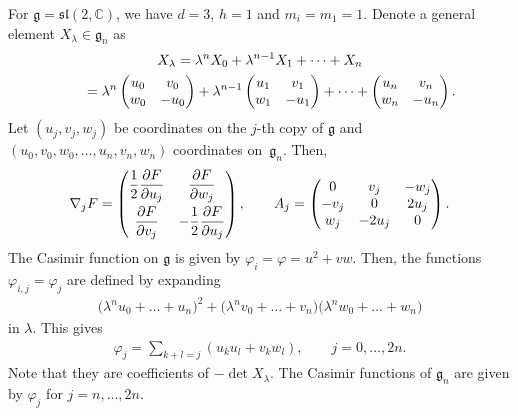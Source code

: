 \documentclass[pdftex]{sigma}
\numberwithin{equation}{section}
\begin{document}
\begin{Example}\label{example2.2}
For $\mathfrak{g} = \mathfrak{sl} (2, \mathbb{C})$, we have $d=3$, $h=1$ and $m_i = m_1 = 1$. Denote a general element $X_\lambda \in \mathfrak{g}_n$ as
\begin{gather*}
X_\lambda = \lambda ^nX_0 + \lambda ^{n-1} X_1 + \dots +X_n \\
\hphantom{X_\lambda}{} = \lambda ^n \left(
\begin{matrix}
u_0 & v_0 \\
w_0 & -u_0
\end{matrix}
\right) + \lambda ^{n-1}\left(
\begin{matrix}
u_1 & v_1 \\
w_1 & -u_1
\end{matrix}
\right) + \dots + \left(
\begin{matrix}
u_n & v_n \\
w_n & -u_n
\end{matrix}
\right).
\end{gather*}
Let $(u_j, v_j, w_j)$ be coordinates on the $j$-th copy of $\mathfrak{g}$ and $(u_0,v_0,w_0, \dots ,u_n,v_n,w_n)$ coordinates on~$\mathfrak{g}_n$. Then,
\begin{gather*}
\nabla _j F = \left(
\begin{matrix}
\displaystyle \frac{1}{2}\frac{\partial F}{\partial u_j} & \displaystyle \frac{\partial F}{\partial w_j} \vspace{1mm}\\
\displaystyle \frac{\partial F}{\partial v_j} & \displaystyle -\frac{1}{2}\frac{\partial F}{\partial u_j}
\end{matrix}
\right), \qquad A_j = \left(
\begin{matrix}
0 & v_j & -w_j \\
-v_j & 0 & 2u_j \\
w_j & -2u_j & 0
\end{matrix}
\right).
\end{gather*}
The Casimir function on $\mathfrak{g}$ is given by $\varphi _i = \varphi = u^2 + vw$. Then, the functions $\varphi _{i,j} = \varphi _j$ are def\/ined by expanding
\begin{gather*}
\big(\lambda ^n u_0 + \dots + u_n\big)^2 + \big(\lambda ^n v_0 + \dots + v_n\big)\big(\lambda ^n w_0 + \dots + w_n\big)
\end{gather*}
in $\lambda $. This gives
\begin{gather*}
\varphi _j = \sum_{k+l = j} \left( u_ku_l + v_k w_l \right), \qquad j=0,\dots ,2n.
\end{gather*}
Note that they are coef\/f\/icients of $-\det X_\lambda $. The Casimir functions of $\mathfrak{g}_n$ are given by $\varphi _j$ for $j=n,\dots ,2n$.
\end{Example}
\end{document}

